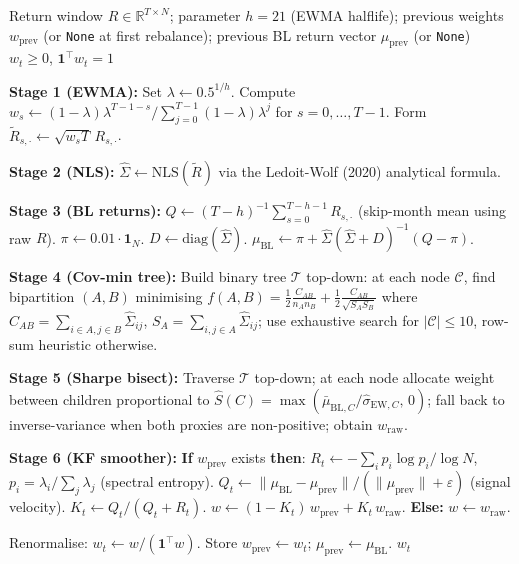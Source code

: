 \documentclass[a4paper,12pt]{report}
\newcommand{\diag}{\mathrm{diag}}
\begin{document}
\begin{algorithm}[H]
\caption{HMVA at rebalance date $t$}
\label{alg:hmva}
\begin{algorithmic}[1]
\Require Return window $R \in \mathbb{R}^{T \times N}$;
         parameter $h=21$ (EWMA halflife);
         previous weights $w_{\mathrm{prev}}$ (or \texttt{None} at first rebalance);
         previous BL return vector $\mu_{\mathrm{prev}}$ (or \texttt{None})
\Ensure  $w_t \geq 0$, $\mathbf{1}^{\top}w_t = 1$

\State \textbf{Stage 1 (EWMA):}
       Set $\lambda \leftarrow 0.5^{1/h}$.
       Compute $w_s \leftarrow (1-\lambda)\lambda^{T-1-s} / \textstyle\sum_{j=0}^{T-1}
       (1-\lambda)\lambda^j$ for $s = 0,\ldots,T-1$.
       Form $\tilde{R}_{s,\cdot} \leftarrow \sqrt{w_s T}\,R_{s,\cdot}$.

\State \textbf{Stage 2 (NLS):}
       $\hat{\Sigma} \leftarrow \mathrm{NLS}(\tilde{R})$
       via the Ledoit-Wolf (2020) analytical formula.

\State \textbf{Stage 3 (BL returns):}
       $Q \leftarrow (T{-}h)^{-1}\textstyle\sum_{s=0}^{T-h-1}R_{s,\cdot}$\;
       (skip-month mean using raw $R$).
       $\pi \leftarrow 0.01 \cdot \mathbf{1}_N$.
       $D \leftarrow \diag(\hat{\Sigma})$.
       $\mu_{\mathrm{BL}} \leftarrow \pi + \hat{\Sigma}(\hat{\Sigma}+D)^{-1}(Q - \pi)$.

\State \textbf{Stage 4 (Cov-min tree):}
       Build binary tree $\mathcal{T}$ top-down: at each node $\mathcal{C}$,
       find bipartition $(A,B)$ minimising
       $f(A,B) = \tfrac{1}{2}\tfrac{C_{AB}}{n_A n_B}
                + \tfrac{1}{2}\tfrac{C_{AB}}{\sqrt{S_A S_B}}$
       where $C_{AB} = \sum_{i\in A,j\in B}\hat{\Sigma}_{ij}$,
       $S_A = \sum_{i,j\in A}\hat{\Sigma}_{ij}$;
       use exhaustive search for $|\mathcal{C}| \leq 10$,
       row-sum heuristic otherwise.

\State \textbf{Stage 5 (Sharpe bisect):}
       Traverse $\mathcal{T}$ top-down; at each node allocate weight between
       children proportional to $\hat{S}(C) = \max(\bar{\mu}_{\mathrm{BL},C}/
       \hat{\sigma}_{\mathrm{EW},C},\, 0)$;
       fall back to inverse-variance when both proxies are non-positive;
       obtain $w_{\mathrm{raw}}$.

\State \textbf{Stage 6 (KF smoother):}
       \textbf{If} $w_{\mathrm{prev}}$ exists \textbf{then}:
       \Statex \qquad $R_t \leftarrow -\textstyle\sum_{i} p_i \log p_i / \log N$,
                     \quad $p_i = \lambda_i/\textstyle\sum_j\lambda_j$
                     (spectral entropy).
       \Statex \qquad $Q_t \leftarrow \|\mu_{\mathrm{BL}} - \mu_{\mathrm{prev}}\|/
                     (\|\mu_{\mathrm{prev}}\|+\varepsilon)$
                     (signal velocity).
       \Statex \qquad $K_t \leftarrow Q_t/(Q_t+R_t)$.
       \Statex \qquad $w \leftarrow (1-K_t)\,w_{\mathrm{prev}} + K_t\,w_{\mathrm{raw}}$.
       \textbf{Else:} $w \leftarrow w_{\mathrm{raw}}$.

\State Renormalise: $w_t \leftarrow w/(\mathbf{1}^{\top}w)$.
\State Store $w_{\mathrm{prev}} \leftarrow w_t$;\quad
       $\mu_{\mathrm{prev}} \leftarrow \mu_{\mathrm{BL}}$.
\State \Return $w_t$
\end{algorithmic}
\end{algorithm}
\end{document}
